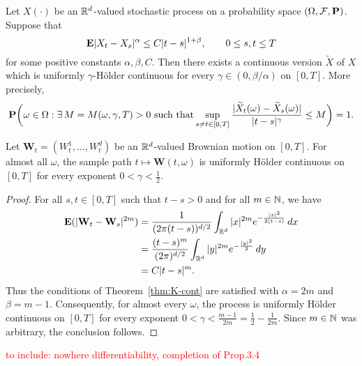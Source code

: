 \begin{theorem}
\label{thm:K-cont}
Let $X(\cdot)$ be an $\mathbb{R}^d$-valued stochastic process on a probability space $(\Omega,\mathcal{F},\mathbf{P})$. Suppose that
\begin{equation}
    \mathbf{E}|X_t-X_s|^\alpha \le C|t-s|^{1+\beta}, \qquad 0\le s,t\le T
\end{equation}
for some positive constants $\alpha, \beta, C$. Then there exists a continuous version $\widetilde{X}$ of $X$ which is uniformly $\gamma$-H\"{o}lder continuous for every $\gamma\in (0,\beta/\alpha)$ on $[0,T]$. More precisely,
\begin{equation*}
    \mathbf{P}\bigg(\omega\in\Omega: \exists\,M=M(\omega,\gamma,T)>0 \text{ such that} \sup_{s\ne t\in [0,T]} \frac{|\widetilde{X}_t(\omega)-\widetilde{X}_s(\omega)|}{|t-s|^\gamma}\le M\bigg) = 1.
\end{equation*}
\end{theorem}

\begin{theorem}
    Let $\mathbf{W}_t = (W^1_t, \ldots, W^d_t)$ be an $\mathbb{R}^d$-valued Brownian motion on $[0,T]$. For almost all $\omega$, the sample path $t\mapsto\mathbf{W}(t,\omega)$ is uniformly H\"{o}lder continuous on $[0,T]$ for every exponent $0<\gamma<\frac{1}{2}$.
\end{theorem}

\begin{proof}
    For all $s,t\in [0,T]$ such that $t-s>0$ and for all $m\in\mathbb{N}$, we have
    \begin{align*}
        \mathbf{E}(|\mathbf{W}_t-\mathbf{W}_s|^{2m}) &= \frac{1}{(2\pi(t-s))^{d/2}}\int_{\mathbb{R}^d} |x|^{2m} e^{-\frac{|x|^2}{2(t-s)}}\,dx \\
        &= \frac{(t-s)^m}{(2\pi)^{d/2}} \int_{\mathbb{R}^d} |y|^{2m}e^{-\frac{|y|^2}{2}}\,dy \\
        &= C|t-s|^m.
    \end{align*}
    Thus the conditions of Theorem~\ref{thm:K-cont} are satisfied with $\alpha=2m$ and $\beta=m-1$. Consequently, for almost every $\omega$, the process is uniformly H\"{o}lder continuous on $[0,T]$ for every exponent $0<\gamma<\frac{m-1}{2m}=\frac{1}{2}-\frac{1}{2m}$. Since $m\in\mathbb{N}$ was arbitrary, the conclusion follows.
\end{proof}

\textcolor{red}{to include: nowhere differentiability, completion of Prop.3.4}